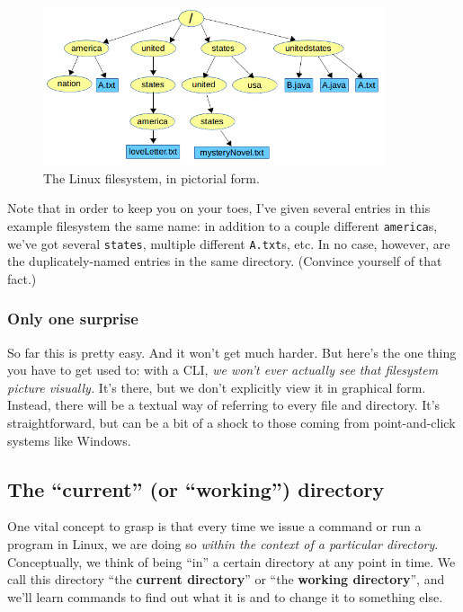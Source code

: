 \begin{figure}[ht]
\centering
\includegraphics[width=0.9\textwidth]{tree.png}  %
\caption{The Linux filesystem, in pictorial form.}
\label{fig:tree}
\end{figure}

Note that in order to keep you on your toes, I've given several entries in
this example filesystem the same name: in addition to a couple different
\texttt{america}s, we've got several \texttt{states}, multiple different
\texttt{A.txt}s, etc. In no case, however, are the duplicately-named entries
in the same directory. (Convince yourself of that fact.)

\subsubsection{Only one surprise}

So far this is pretty easy. And it won't get much harder. But here's the one
thing you have to get used to: with a CLI, \textit{we won't ever actually see
that filesystem picture visually.} It's there, but we don't explicitly view it
in graphical form. Instead, there will be a textual way of referring to every
file and directory. It's straightforward, but can be a bit of a shock to those
coming from point-and-click systems like Windows.

\subsection{The ``current'' (or ``working'') directory}

One vital concept to grasp is that every time we issue a command or run a
program in Linux, we are doing so \textit{within the context of a particular
directory}. Conceptually, we think of being ``in'' a certain directory at any
point in time. We call this directory ``the \textbf{current directory}'' or
``the \textbf{working directory}'', and we'll learn commands to find out what
it is and to change it to something else.

